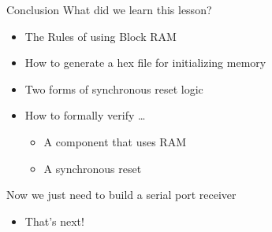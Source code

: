 \documentclass[style=gt,mode=present,paper=screen]{powerdot}
\begin{document}
%
%
\begin{slide}[method=file]{Conclusion}
What did we learn this lesson?
\begin{itemize}
\item The Rules of using Block RAM
\item How to generate a hex file for initializing memory
\item Two forms of synchronous reset logic
\item How to formally verify \ldots
	\begin{itemize}
	\item A component that uses RAM
	\item A synchronous reset
	\end{itemize}
\end{itemize}
Now we just need to build a serial port receiver
\pause
\begin{itemize}
\item That's next!
\end{itemize}
\end{slide}
%
%
\end{document}
